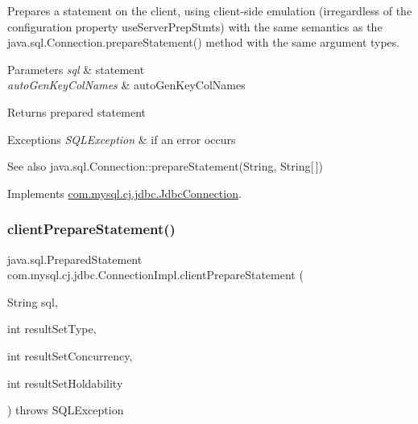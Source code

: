 Prepares a statement on the client, using client-\/side emulation (irregardless of the configuration property \textquotesingle{}use\+Server\+Prep\+Stmts\textquotesingle{}) with the same semantics as the java.\+sql.\+Connection.\+prepare\+Statement() method with the same argument types.


\begin{DoxyParams}{Parameters}
{\em sql} & statement \\
\hline
{\em auto\+Gen\+Key\+Col\+Names} & auto\+Gen\+Key\+Col\+Names \\
\hline
\end{DoxyParams}
\begin{DoxyReturn}{Returns}
prepared statement 
\end{DoxyReturn}

\begin{DoxyExceptions}{Exceptions}
{\em S\+Q\+L\+Exception} & if an error occurs\\
\hline
\end{DoxyExceptions}
\begin{DoxySeeAlso}{See also}
java.\+sql.\+Connection\+::prepare\+Statement(\+String, String\mbox{[}$\,$\mbox{]}) 
\end{DoxySeeAlso}


Implements \mbox{\hyperlink{interfacecom_1_1mysql_1_1cj_1_1jdbc_1_1_jdbc_connection_a46a218367bb0a386a18caed711142d7a}{com.\+mysql.\+cj.\+jdbc.\+Jdbc\+Connection}}.

\mbox{\label{classcom_1_1mysql_1_1cj_1_1jdbc_1_1_connection_impl_ade6127c1a3fdabd2af201e60498afad4}} 
\subsubsection{\texorpdfstring{client\+Prepare\+Statement()}{clientPrepareStatement()}\hspace{0.1cm}{\footnotesize\ttfamily [6/6]}}
{\footnotesize\ttfamily java.\+sql.\+Prepared\+Statement com.\+mysql.\+cj.\+jdbc.\+Connection\+Impl.\+client\+Prepare\+Statement (\begin{DoxyParamCaption}\item[{String}]{sql,  }\item[{int}]{result\+Set\+Type,  }\item[{int}]{result\+Set\+Concurrency,  }\item[{int}]{result\+Set\+Holdability }\end{DoxyParamCaption}) throws S\+Q\+L\+Exception}

